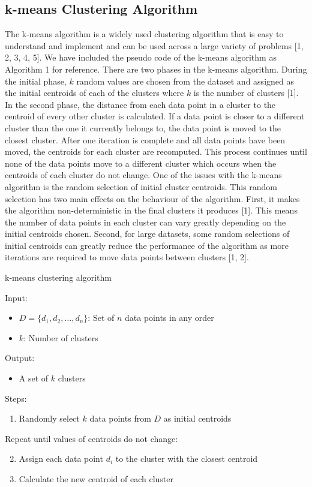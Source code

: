 \documentclass[conference,compsoc]{IEEEtran}
\begin{document}
\subsection{k-means Clustering Algorithm}

The k-means algorithm is a widely used clustering algorithm that is easy to understand and implement and can be used across a large variety of problems [1, 2, 3, 4, 5]. We have included the pseudo code of the k-means algorithm as Algorithm 1 for reference. There are two phases in the k-means algorithm. During the initial phase, $k$ random values are chosen from the dataset and assigned as the initial centroids of each of the clusters where $k$ is the number of clusters [1]. In the second phase, the distance from each data point in a cluster to the centroid of every other cluster is calculated. If a data point is closer to a different cluster than the one it currently belongs to, the data point is moved to the closest cluster. After one iteration is complete and all data points have been moved, the centroids for each cluster are recomputed. This process continues until none of the data points move to a different cluster which occurs when the centroids of each cluster do not change. One of the issues with the k-means algorithm is the random selection of initial cluster centroids. This random selection has two main effects on the behaviour of the algorithm. First, it makes the algorithm non-deterministic in the final clusters it produces [1]. This means the number of data points in each cluster can vary greatly depending on the initial centroids chosen. Second, for large datasets, some random selections of initial centroids can greatly reduce the performance of the algorithm as more iterations are required to move data points between clusters [1, 2].

\begin{algorithm}\label{alg-1}
    \caption{k-means clustering algorithm}
    Input:
        \begin{itemize}
            \item $D = \{d_1, d_2, \dots, d_n\}$: Set of $n$ data points in any order
            \item $k$: Number of clusters
        \end{itemize}
    Output:
        \begin{itemize}
            \item A set of $k$ clusters
        \end{itemize}
    Steps:
        \begin{enumerate}
            \item Randomly select $k$ data points from $D$ as initial centroids
        \end{enumerate}
        Repeat until values of centroids do not change:
        \begin{enumerate}
        \setcounter{enumi}{1}
            \item Assign each data point $d_i$ to the cluster with the closest centroid
            \item Calculate the new centroid of each cluster
        \end{enumerate}
\end{algorithm}
\end{document}
